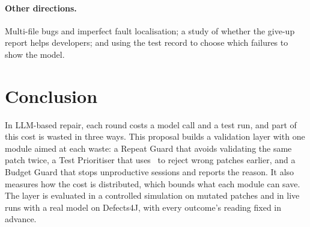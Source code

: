 \paragraph{Other directions.} Multi-file bugs and imperfect fault
localisation; a study of whether the give-up report helps developers; and using
the test record to choose which failures to show the model.

\section{Conclusion}
\label{sec:plan-conclusion}

In LLM-based repair, each round costs a model call and a test run, and part of
this cost is wasted in three ways. This proposal builds a validation layer with
one module aimed at each waste: a Repeat Guard that avoids
validating the same patch twice, a Test Prioritiser that uses \km\ to reject
wrong patches earlier, and a Budget Guard that stops unproductive sessions and
reports the reason. It also measures how the cost is distributed, which bounds
what each module can save. The layer is evaluated in a controlled
simulation on mutated patches and in live runs with a real model on Defects4J,
with every outcome's reading fixed in advance.
